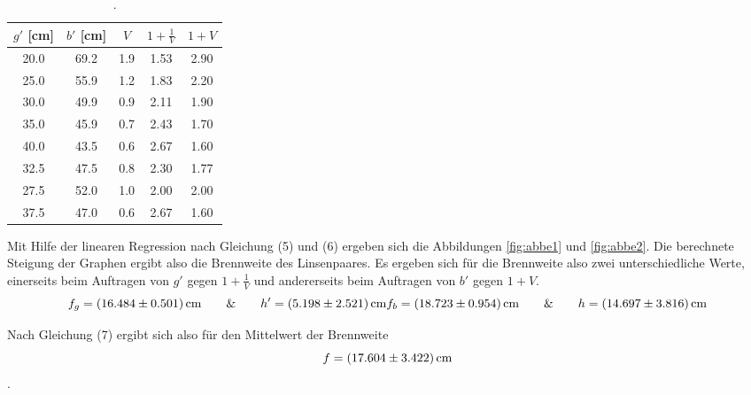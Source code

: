 \begin{table}[H]
    \begin{center}
      \caption{.}
      \label{tab:tres}
      \begin{tabular}{c|c|c|c|c} 
        \textbf{$g'$ [cm]} & \textbf{$b'$ [cm]} & \textbf{$V$} & \textbf{$1 + \frac{1}{V}$} & \textbf{$1 + V$}\\
        \hline
        20.0 & 69.2 & 1.9 & 1.53 & 2.90 \\
        25.0 & 55.9 & 1.2 & 1.83 & 2.20 \\
        30.0 & 49.9 & 0.9 & 2.11 & 1.90 \\
        35.0 & 45.9 & 0.7 & 2.43 & 1.70 \\
        40.0 & 43.5 & 0.6 & 2.67 & 1.60 \\
        32.5 & 47.5 & 0.8 & 2.30 & 1.77 \\
        27.5 & 52.0 & 1.0 & 2.00 & 2.00 \\
        37.5 & 47.0 & 0.6 & 2.67 & 1.60
      \end{tabular}
    \end{center}
  \end{table}

Mit Hilfe der linearen Regression nach Gleichung (5) und (6) ergeben sich die Abbildungen \ref{fig:abbe1} und \ref{fig:abbe2}.
Die berechnete Steigung der Graphen ergibt also die Brennweite des Linsenpaares.
Es ergeben sich für die Brennweite also zwei unterschiedliche Werte, einerseits beim Auftragen von $g'$ gegen $1+\frac{1}{V}$ und andererseits beim Auftragen von $b'$ gegen $1+V$.
\begin{equation}
    f_g = \SI{16.484 \pm 0.501}{cm}  \qquad \text{\&} \qquad h' = \SI{5.198 \pm 2.521}{cm} \\ 
    f_b = \SI{18.723 \pm 0.954}{cm}  \qquad \text{\&} \qquad h = \SI{14.697 \pm 3.816}{cm}  \notag
\end{equation}

Nach Gleichung (7) ergibt sich also für den Mittelwert der Brennweite
\begin{equation}
    f = \SI{17.604 \pm 3.422}{cm}  \notag
\end{equation}.

